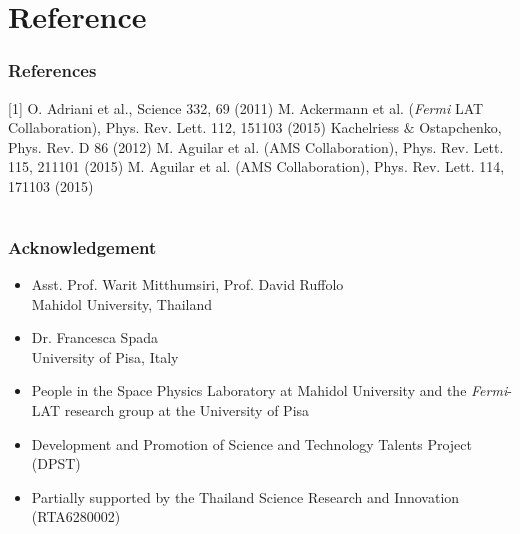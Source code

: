 \documentclass{beamer}
\begin{document}


\section{} %

\section{Reference}
\begin{frame}
\frametitle{References}
[1] O. Adriani et al., Science 332, 69 (2011) \newline
[2] M. Ackermann et al. (\textit{Fermi} LAT Collaboration), Phys. Rev. Lett. 112, 151103 (2015) \newline
[3] Kachelriess $\&$ Ostapchenko, Phys. Rev. D 86 (2012) \newline
[4] M. Aguilar et al. (AMS Collaboration), Phys. Rev. Lett. 115, 211101 (2015) \newline
[5] M. Aguilar et al. (AMS Collaboration), Phys. Rev. Lett. 114, 171103 (2015) \newline
\end{frame}
\section{}
\begin{frame}\frametitle{Acknowledgement}
  \begin{itemize}
    \item Asst. Prof. Warit Mitthumsiri, Prof. David Ruffolo \\ Mahidol University, Thailand
    \item Dr. Francesca Spada \\ University of Pisa, Italy
    \item People in the Space Physics Laboratory at Mahidol University and the \textit{Fermi}-LAT research group at the University of Pisa
    \item Development and Promotion of Science and Technology Talents Project (DPST)
    \item Partially supported by the Thailand Science Research and Innovation (RTA6280002)
  \end{itemize}
\end{frame}
\end{document}
